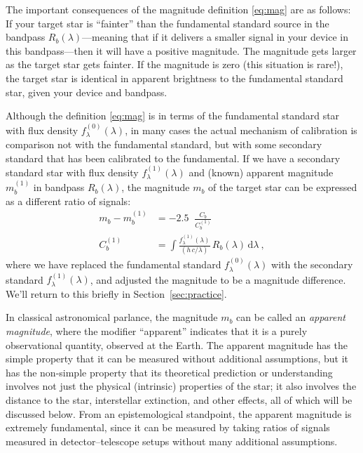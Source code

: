 \documentclass[10pt]{article}
\newcommand{\sectionname}{Section}
\newcommand{\secref}[1]{\sectionname~\ref{#1}}
\newcommand{\dd}{\mathrm{d}}
\DeclareMathOperator{\logten}{log_{10}}
\begin{document}
The important consequences of the magnitude definition \eqref{eq:mag} are as follows:
If your target star is ``fainter'' than the fundamental standard source in the bandpass $R_b(\lambda)$---meaning that if it delivers a smaller signal in your device in this bandpass---then it will have a positive magnitude.
The magnitude gets larger as the target star gets fainter.
If the magnitude is zero (this situation is rare!), the target star is identical in apparent brightness to the fundamental standard star, given your device and bandpass.

Although the definition \eqref{eq:mag} is in terms of the fundamental standard star with flux density $f^{(0)}_\lambda(\lambda)$, in many cases the actual mechanism of calibration is comparison not with the fundamental standard, but with some secondary standard that has been calibrated to the fundamental.
If we have a secondary standard star with flux density $f^{(1)}_\lambda(\lambda)$ and (known) apparent magnitude $m_b^{(1)}$ in bandpass $R_b(\lambda)$, the magnitude $m_b$ of the target star can be expressed as a different ratio of signals:
\begin{align}
    m_b - m_b^{(1)} &= -2.5\logten\frac{C_b}{C^{(1)}_b}\label{eq:secondary}\\
    C^{(1)}_b &= \int \frac{f^{(1)}_\lambda(\lambda)}{(h\,c/\lambda)}\,R_b(\lambda)\,\dd\lambda ~,
\end{align}
where we have replaced the fundamental standard $f^{(0)}_\lambda(\lambda)$ with the secondary standard $f^{(1)}_\lambda(\lambda)$, and adjusted the magnitude to be a magnitude difference.
We'll return to this briefly in \secref{sec:practice}.

In classical astronomical parlance, the magnitude $m_b$ can be called an \emph{apparent magnitude}, where the modifier ``apparent'' indicates that it is a purely observational quantity, observed at the Earth.
The apparent magnitude has the simple property that it can be measured without additional assumptions, but it has the non-simple property that its theoretical prediction or understanding involves not just the physical (intrinsic) properties of the star; it also involves the distance to the star, interstellar extinction, and other effects, all of which will be discussed below.
From an epistemological standpoint, the apparent magnitude is extremely fundamental, since it can be measured by taking ratios of signals measured in detector--telescope setups without many additional assumptions.
\end{document}
